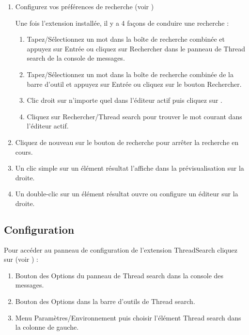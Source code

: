 \begin{enumerate}
\item Configurez vos préférences de recherche (voir )

Une fois l'extension installée, il y a 4 façons de conduire une recherche :

\begin{enumerate}
\item Tapez/Sélectionnez un mot dans la boîte de recherche combinée et appuyez sur Entrée ou cliquez sur Rechercher dans le panneau de Thread search de la console de messages.
\item Tapez/Sélectionnez un mot dans la boîte de recherche combinée de la barre d'outil et appuyez sur Entrée ou cliquez sur le bouton Rechercher.
\item Clic droit sur n'importe quel  dans l'éditeur actif puis cliquez sur .
\item Cliquez sur Rechercher/Thread search pour trouver le mot courant dans l'éditeur actif.
\end{enumerate}
\item Cliquez de nouveau sur le bouton de recherche pour arrêter la recherche en cours.
\item Un clic simple sur un élément résultat l'affiche dans la prévisualisation sur la droite.
\item Un double-clic sur un élément résultat ouvre ou configure un éditeur sur la droite.
\end{enumerate}

\subsection{Configuration}

Pour accéder au panneau de configuration de l'extension ThreadSearch cliquez sur (voir ) :


\begin{enumerate}
\item Bouton des Options du panneau de Thread search dans la console des messages.
\item Bouton des Options dans la barre d'outils de Thread search.
\item Menu Paramètres/Environnement puis choisir l'élément Thread search dans la colonne de gauche.
\end{enumerate}

